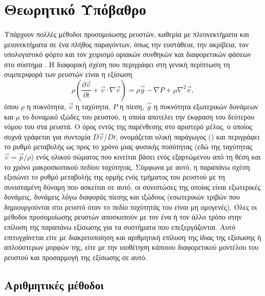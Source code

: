 \section{Θεωρητικό Υπόβαθρο}
\paragraph{} Υπάρχουν πολλές μέθοδοι προσομοίωσης ρευστών, καθεμία με πλεονεκτήματα και
μειονεκτήματα σε ένα πλήθος παραγόντων, όπως την ευστάθεια, την ακρίβεια, τον υπολογιστικό
φόρτο και τον χειρισμό οριακών συνθηκών και διαφορετικών φάσεων στο σύστημα
\cite{Tan2009723}. H διαφορική σχέση που περιγράφει στη γενική περίπτωση τη συμπεριφορά
των ρευστών είναι η εξίσωση 
\begin{equation}
  \label{eq:navier-stokes}
  \rho \left( \frac{\partial \vec{v}}{\partial t} + \vec{v} \cdot \nabla \vec{v} \right) =
  \rho \vec{g} - \nabla P + \mu \nabla^2 \vec{v},
\end{equation}
όπου $\rho$ η πυκνότητα, $\vec{v}$ η ταχύτητα, $P$ η πίεση, $\vec{g}$ η πυκνότητα
εξωτερικών δυνάμεων και $\mu$ το δυναμικό ιξώδες του ρευστού, η οποία αποτελει την έκφραση
του δεύτερου νόμου του  στα ρευστά. Ο όρος εντός της παρένθεσης στο αριστερό
μέλος, ο οποίος συχνά γράφεται για συντομία $D\vec{v}/Dt$, ονομάζεται υλική παράγωγος
() και περιγράφει το ρυθμό μεταβολής ως προς το χρόνο μιας
φυσικής ποσότητας (εδώ της ταχύτητας $\vec{v}=\vec{p}/\rho$) ενός υλικού σώματος που
κινείται βάσει ενός εξαρτώμενου από τη θέση και το χρόνο μακροσκοπικού πεδίου
ταχύτητας. Σύμφωνα με αυτό, η παραπάνω σχέση εξισώνει το ρυθμό μεταβολής της ορμής ενός
τμήματος του ρευστού με τη συνισταμένη δύναμη που ασκείται σε αυτό, οι συνιστώσες της
οποίας είναι εξωτερικές δυνάμεις, δυνάμεις λόγω διαφοράς πίεσης και ιξώδους (εσωτερικών
τριβών που δημιουργούνται στο ρευστό όταν το πεδίο ταχύτητάς του είναι μη ομογενές). Όλες
οι μέθοδοι προσομοίωσης ρευστών αποσκοπούν με τον ένα ή τον άλλο τρόπο στην επίλυση της
παραπάνω εξίσωσης για τα συστήματα που επεξεργάζονται. Αυτό επιτυγχάνεται είτε με
διακριτοποίηση και αριθμητική επίλυση της ίδιας της εξίσωσης ή απλούστερων μορφών της,
είτε με την υιοθέτηση κάποιου διαφορετικού μοντέλου του ρευστού και προσαρμογή της
εξίσωσης σε αυτό.

\subsection{Αριθμητικές μέθοδοι}
